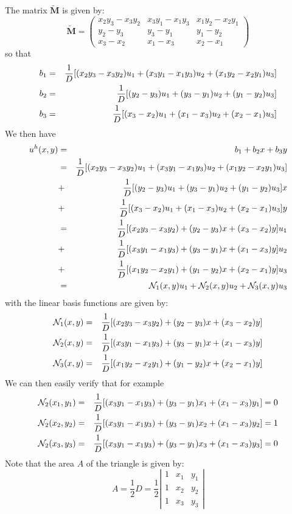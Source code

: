 The matrix $\tilde{\bm M}$ is given by:
\[
\tilde{\bm M}
=
\left(
\begin{array}{ccc}
x_2y_3-x_3y_2 & x_3y_1-x_1y_3 & x_1y_2-x_2y_1 \\
y_2-y_3 & y_3-y_1  & y_1-y_2 \\
x_3-x_2 & x_1-x_3 & x_2-x_1 
\end{array}
\right)
\]
so that 
\begin{eqnarray}
b_1 &=& \frac1D [ (x_2y_3-x_3y_2)u_1 + (x_3y_1-x_1y_3)u_2 + (x_1y_2-x_2y_1)u_3 ] \nonumber\\
b_2 &=& \frac1D [ (y_2-y_3)u_1 + (y_3-y_1)u_2 + (y_1-y_2)u_3 ] \nonumber\\
b_3 &=& \frac1D [ (x_3-x_2)u_1 + (x_1-x_3)u_2 + (x_2-x_1)u_3 ]
\end{eqnarray}
We then have
\begin{eqnarray}
u^h(x,y) 
&=& b_1 + b_2 x + b_3 y \nonumber\\
&=&\frac1D [(x_2y_3-x_3y_2)u_1 + (x_3y_1-x_1y_3)u_2 + (x_1y_2-x_2y_1)u_3 ] \nonumber\\
&+&\frac1D [(y_2-y_3)u_1 + (y_3-y_1)u_2 + (y_1-y_2)u_3]x \nonumber\\
&+&\frac1D [(x_3-x_2)u_1 + (x_1-x_3)u_2 + (x_2-x_1)u_3]y \nonumber\\
&=&\frac1D [(x_2y_3-x_3y_2) + (y_2-y_3)x + (x_3-x_2)y]u_1\nonumber\\ 
&+&\frac1D [(x_3y_1-x_1y_3) + (y_3-y_1) x + (x_1-x_3) y]u_2 \nonumber\\
&+&\frac1D [(x_1y_2-x_2y_1) + (y_1-y_2) x + (x_2-x_1) y]u_3\nonumber\\
&=& {\mathcal{N}}_1(x,y) u_1 + {\mathcal{N}}_2(x,y) u_2 + {\mathcal{N}}_3(x,y) u_3
\end{eqnarray}
with the linear basis functions are given by:
\begin{eqnarray}
{\mathcal{N}}_1(x,y) &=& \frac{1}{D}[(x_2y_3-x_3y_2) + (y_2-y_3)x + (x_3-x_2)y] \nonumber\\
{\mathcal{N}}_2(x,y) &=& \frac{1}{D}[(x_3y_1-x_1y_3) + (y_3-y_1)x + (x_1-x_3)y] \nonumber\\
{\mathcal{N}}_3(x,y) &=& \frac{1}{D}[(x_1y_2-x_2y_1) + (y_1-y_2)x + (x_2-x_1)y] \nonumber
\end{eqnarray}
We can then easily verify that for example
\begin{eqnarray}
{\mathcal{N}}_2(x_1,y_1)&=& \frac{1}{D}[(x_3y_1-x_1y_3) + (y_3-y_1)x_1 + (x_1-x_3)y_1] = 0 \\
{\mathcal{N}}_2(x_2,y_2)&=& \frac{1}{D}[(x_3y_1-x_1y_3) + (y_3-y_1)x_2 + (x_1-x_3)y_2] = 1 \\
{\mathcal{N}}_2(x_3,y_3)&=& \frac{1}{D}[(x_3y_1-x_1y_3) + (y_3-y_1)x_3 + (x_1-x_3)y_3] = 0 
\end{eqnarray}
Note that the area $A$ of the triangle is given by:
\[
A=\frac{1}{2}D = \frac{1}{2}
\left|
\begin{array}{ccc}
1 & x_1 & y_1 \\
1 & x_2 & y_2 \\
1 & x_3 & y_3 
\end{array}
\right|
\]

